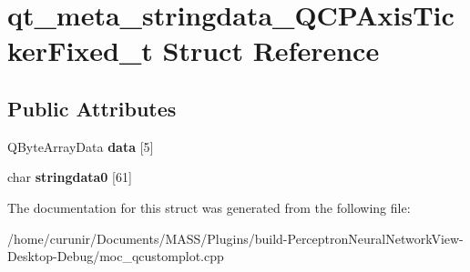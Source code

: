 \hypertarget{structqt__meta__stringdata___q_c_p_axis_ticker_fixed__t}{}\section{qt\+\_\+meta\+\_\+stringdata\+\_\+\+Q\+C\+P\+Axis\+Ticker\+Fixed\+\_\+t Struct Reference}
\label{structqt__meta__stringdata___q_c_p_axis_ticker_fixed__t}
\subsection*{Public Attributes}
\begin{DoxyCompactItemize}
\item 
Q\+Byte\+Array\+Data {\bfseries data} \mbox{[}5\mbox{]}\hypertarget{structqt__meta__stringdata___q_c_p_axis_ticker_fixed__t_a6a154326b81876525a18cc787d72999a}{}\label{structqt__meta__stringdata___q_c_p_axis_ticker_fixed__t_a6a154326b81876525a18cc787d72999a}

\item 
char {\bfseries stringdata0} \mbox{[}61\mbox{]}\hypertarget{structqt__meta__stringdata___q_c_p_axis_ticker_fixed__t_a4624793f0a8202895228fd43a030e135}{}\label{structqt__meta__stringdata___q_c_p_axis_ticker_fixed__t_a4624793f0a8202895228fd43a030e135}

\end{DoxyCompactItemize}


The documentation for this struct was generated from the following file\+:\begin{DoxyCompactItemize}
\item 
/home/curunir/\+Documents/\+M\+A\+S\+S/\+Plugins/build-\/\+Perceptron\+Neural\+Network\+View-\/\+Desktop-\/\+Debug/moc\+\_\+qcustomplot.\+cpp\end{DoxyCompactItemize}
